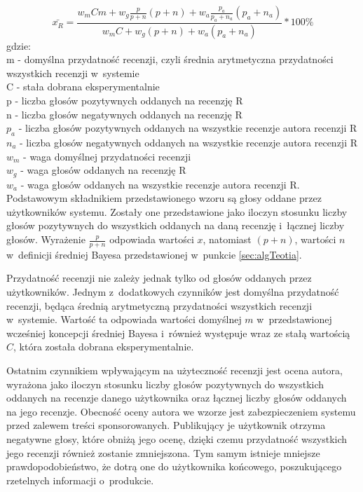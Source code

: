 \begin{equation}
\bar{x_{R}}=\frac{w_{m}Cm+w_{g}\frac{p}{p+n}(p+n)+w_{a}\frac{p_{a}}{p_{a}+n_{a}}(p_{a}+n_{a})}{w_{m}C+w_{g}(p+n)+w_{a}(p_{a}+n_{a})}*100\%
\end{equation}
gdzie:\\
m - domyślna przydatność recenzji, czyli średnia arytmetyczna przydatności wszystkich recenzji w~systemie\\
C - stała dobrana eksperymentalnie\\
p - liczba głosów pozytywnych oddanych na recenzję R\\
n - liczba głosów negatywnych oddanych na recenzję R\\
$p_{a}$ - liczba głosów pozytywnych oddanych na wszystkie recenzje autora recenzji R\\
$n_{a}$ - liczba głosów negatywnych oddanych na wszystkie recenzje autora recenzji R\\
$w_{m}$ - waga domyślnej przydatności recenzji\\
$w_{g}$ - waga głosów oddanych na recenzję R\\
$w_{a}$ - waga głosów oddanych na wszystkie recenzje autora recenzji R.\\


Podstawowym składnikiem przedstawionego wzoru są głosy oddane przez użytkowników systemu. Zostały one przedstawione jako iloczyn stosunku liczby głosów pozytywnych do wszystkich oddanych na daną recenzję i~łącznej liczby głosów. Wyrażenie $\frac{p}{p+n}$ odpowiada wartości $x$, natomiast $(p + n)$, wartości $n$ w~definicji średniej Bayesa przedstawionej w~punkcie \ref{sec:algTeotia}.

Przydatność recenzji nie zależy jednak tylko od głosów oddanych przez użytkowników. Jednym z~dodatkowych czynników jest domyślna przydatność recenzji, będąca średnią arytmetyczną przydatności wszystkich recenzji w~systemie. Wartość ta odpowiada wartości domyślnej $m$ w~przedstawionej wcześniej koncepcji średniej Bayesa i~również występuje wraz ze stałą wartością $C$, która została dobrana eksperymentalnie.

Ostatnim czynnikiem wpływającym na użyteczność recenzji jest ocena autora, wyrażona jako iloczyn stosunku liczby głosów pozytywnych do wszystkich oddanych na recenzje danego użytkownika oraz łącznej liczby głosów oddanych na jego recenzje. Obecność oceny autora we wzorze jest zabezpieczeniem systemu przed zalewem treści sponsorowanych. Publikujący je użytkownik otrzyma negatywne głosy, które obniżą jego ocenę, dzięki czemu przydatność wszystkich jego recenzji również zostanie zmniejszona. Tym samym istnieje mniejsze prawdopodobieństwo, że dotrą one do użytkownika końcowego, poszukującego rzetelnych informacji o~produkcie. 

